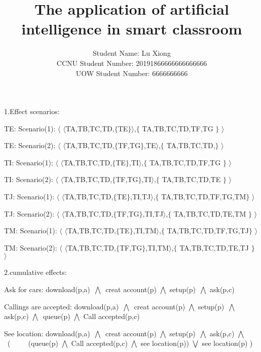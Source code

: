 \documentclass[runningheads]{llncs}
\begin{document}
\title{\large{The application of artificial intelligence in smart classroom}}

%
%
\author{\large{Student Name: Lu Xiong \\ %
CCNU Student Number: 20191866666666666666 \\ %
UOW Student Number: 6666666666}}  %







\maketitle


1.Effect scenarios:

TE: Scenario(1): $\langle$ $\langle$TA,TB,TC,TD,$\{$TE$\}$$\rangle$,$\{$ TA,TB,TC,TD,TF,TG $\}$ $\rangle$

TE: Scenario(2): $\langle$ $\langle$TA,TB,TC,TD,$\{$TF,TG$\}$,TE$\rangle$,$\{$ TA,TB,TC,TD,$\}$ $\rangle$

TI: Scenario(1): $\langle$ $\langle$TA,TB,TC,TD,$\{$TE$\}$,TI$\rangle$,$\{$ TA,TB,TC,TD,TF,TG $\}$ $\rangle$

TI: Scenario(2): $\langle$ $\langle$TA,TB,TC,TD,$\{$TF,TG$\}$,TI$\rangle$,$\{$ TA,TB,TC,TD,TE $\}$ $\rangle$

TJ: Scenario(1): $\langle$ $\langle$TA,TB,TC,TD,$\{$TE$\}$,TI,TJ$\rangle$,$\{$ TA,TB,TC,TD,TF,TG,TM$\}$ $\rangle$

TJ: Scenario(2): $\langle$ $\langle$TA,TB,TC,TD,$\{$TF,TG$\}$,TI,TJ$\rangle$,$\{$ TA,TB,TC,TD,TE,TM $\}$ $\rangle$

TM: Scenario(1): $\langle$ $\langle$TA,TB,TC,TD,$\{$TE$\}$,TI,TM$\rangle$,$\{$ TA,TB,TC,TD,TF,TG,TJ$\}$ $\rangle$

TM: Scenario(2): $\langle$ $\langle$TA,TB,TC,TD,$\{$TF,TG$\}$,TI,TM$\rangle$,$\{$ TA,TB,TC,TD,TE,TJ $\}$ $\rangle$


2.cumulative effects:

Ask for cars: download(p,a)\ $\bigwedge$\ creat account(p) $\bigwedge$ setup(p)\ $\bigwedge$ ask(p,c)

Callings are accepted: download(p,a)\ $\bigwedge$\ creat account(p) $\bigwedge$ setup(p)\ $\bigwedge$ ask(p,c) $\bigwedge$\ queue(p) $\bigwedge$ Call accepted(p,c)

See location: download(p,a)\ $\bigwedge$\ creat account(p) $\bigwedge$ setup(p)\ $\bigwedge$ ask(p,c) $\bigwedge$\ (\ \ \ \ \ (queue(p) $\bigwedge$ Call accepted(p,c) $\bigwedge$ see location(p)) $\bigvee$ see location(p) )
\end{document}
